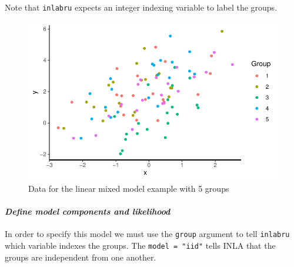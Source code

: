 \documentclass[
  letterpaper,
  DIV=11,
  numbers=noendperiod]{scrartcl}
\let\oldparagraph\paragraph
\renewcommand{\paragraph}[1]{\oldparagraph{#1}\mbox{}}
\newenvironment{Shaded}{\begin{snugshade}}{\end{snugshade}}
\newcommand{\AttributeTok}[1]{\textcolor[rgb]{0.40,0.45,0.13}{#1}}
\newcommand{\FunctionTok}[1]{\textcolor[rgb]{0.28,0.35,0.67}{#1}}
\newcommand{\NormalTok}[1]{\textcolor[rgb]{0.00,0.23,0.31}{#1}}
\newcommand{\OtherTok}[1]{\textcolor[rgb]{0.00,0.23,0.31}{#1}}
\newcommand{\SpecialCharTok}[1]{\textcolor[rgb]{0.37,0.37,0.37}{#1}}
\newcommand{\StringTok}[1]{\textcolor[rgb]{0.13,0.47,0.30}{#1}}
\begin{document}
Note that \texttt{inlabru} expects an integer indexing variable to label
the groups.

\begin{Shaded}
\end{Shaded}

\begin{figure}[H]

{\centering \includegraphics{day1_practical_files/figure-pdf/plot_data_lmm-1.pdf}

}

\caption{Data for the linear mixed model example with 5 groups}

\end{figure}%

\paragraph{\texorpdfstring{\textbf{\emph{Define model components and
likelihood}}}{Define model components and likelihood}}\label{define-model-components-and-likelihood}

In order to specify this model we must use the \texttt{group} argument
to tell \texttt{inlabru} which variable indexes the groups. The
\texttt{model\ =\ "iid"} tells INLA that the groups are independent from
one another.
\end{document}
